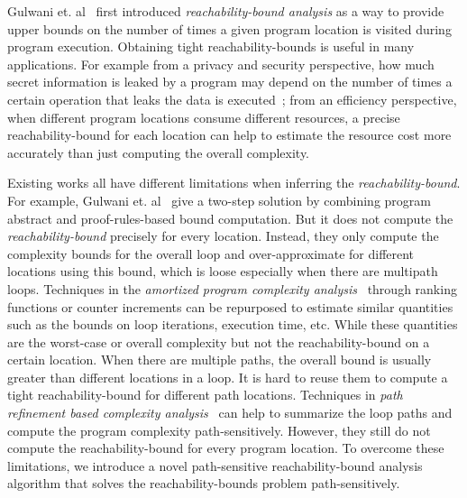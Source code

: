 
Gulwani et. al~\cite{GulwaniZ10} first introduced \emph{reachability-bound analysis} as a way to provide upper bounds on the number of times a given program location 
is visited during program execution.
Obtaining tight reachability-bounds is useful in many applications.
For example from a privacy and security perspective,
how much secret information is leaked by a program may depend on the number of times a certain operation that leaks the data
is executed~\cite{Malacaria07};
from an efficiency perspective, when different program locations consume different resources, a precise reachability-bound for each location can help to estimate the resource cost more accurately than just computing the overall complexity.

Existing works all have different limitations when inferring the \emph{reachability-bound}.
For example, Gulwani et. al~\cite{GulwaniZ10}
give a two-step solution by combining program abstract and proof-rules-based bound computation.
But it does not compute the \emph{reachability-bound} precisely for every location.
Instead, they only compute the complexity bounds for the overall loop and over-approximate for different locations using this bound,
which is loose especially when there are multipath loops.
Techniques in the \emph{amortized program complexity analysis}~\cite{BradleyMS05,CookSZ13,Zuleger18,ZulegerGSV11,SinnZV14,SinnZV17,LuCT21,AliasDFG10} through ranking functions or counter increments
can be repurposed to estimate similar quantities such as the
bounds on loop iterations, execution time, etc.
While these quantities are the worst-case or overall complexity but not the reachability-bound on a certain location. When there are multiple paths, the overall bound is usually greater than different locations in a loop.
It is hard to reuse them to compute a tight reachability-bound for different path locations.
Techniques in \emph{path refinement based complexity analysis}~\cite{GustafssonEL05,ManoliosV06,BalakrishnanSIG09,SharmaDDA11,Flores-MontoyaH14,HumenbergerJK18,CyphertBKR19,GulwaniJK09,ZulegerGSV11}
can help to summarize the loop paths and compute the program complexity path-sensitively. However, they still do not compute the  reachability-bound for every program location.
To overcome these limitations, 
we introduce a novel path-sensitive reachability-bound analysis algorithm that solves 
the reachability-bounds problem path-sensitively.

